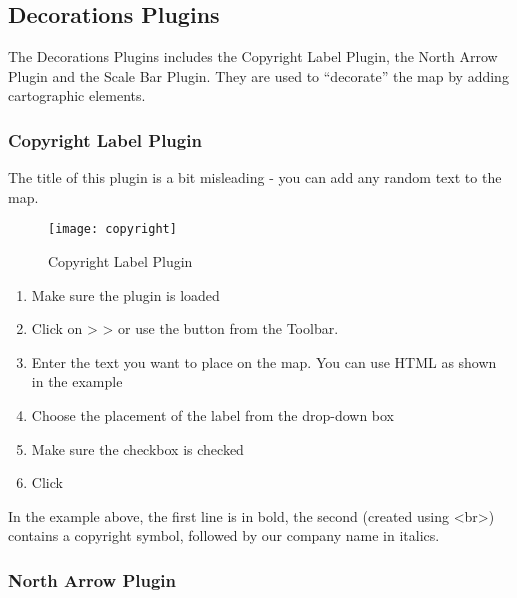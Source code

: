 
\subsection{Decorations Plugins}


The Decorations Plugins includes the Copyright Label Plugin, the North 
Arrow Plugin and the Scale Bar Plugin. They are used to ``decorate'' the 
map by adding cartographic elements. 

\subsubsection{Copyright Label Plugin}

The title of this plugin is a bit misleading - you can add any random text to the map.

\begin{figure}[ht]
   \begin{center}
   \caption{Copyright Label Plugin \nixcaption}\label{fig:copyright}\smallskip
   \texttt{[image: copyright]}
\end{center}  
\end{figure}

\begin{enumerate}
\item Make sure the plugin is loaded
\item Click on  >  >  or use the  button from the Toolbar.
\item Enter the text you want to place on the map. You can use HTML as
  shown in the example
\item Choose the placement of the label from the  drop-down box
\item Make sure the  checkbox is checked
\item Click  
\end{enumerate}

In the example above, the first line is in bold, the second (created using
\textless br\textgreater) contains a copyright symbol, followed by our company name in
italics.

\subsubsection{North Arrow Plugin}

